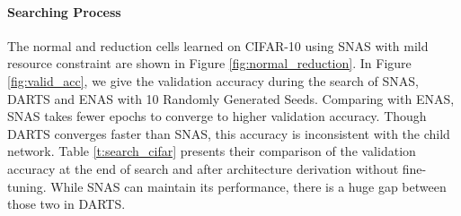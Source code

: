 \documentclass{article} \usepackage{iclr2019_conference,times}
\newcommand{\tomodify}{\color{black}}
\newcommand{\zh}{\color{black}}
\begin{document}
\paragraph{Searching Process}

{\tomodify The normal and reduction cells learned on CIFAR-10 using SNAS with mild resource constraint are shown in Figure \ref{fig:normal_reduction}.} In Figure \ref{fig:valid_acc}, we give the validation accuracy during the search of SNAS, DARTS and ENAS with 10 Randomly Generated Seeds. Comparing with ENAS, SNAS takes {\zh fewer} epochs to converge to higher validation accuracy. Though DARTS converges faster than SNAS, this accuracy is inconsistent with the child network. Table \ref{t:search_cifar} presents their comparison of the validation accuracy {\zh at} the end of search and after architecture derivation without fine-tuning. While SNAS can maintain its performance, there is a huge gap between those two in DARTS.
\end{document}
